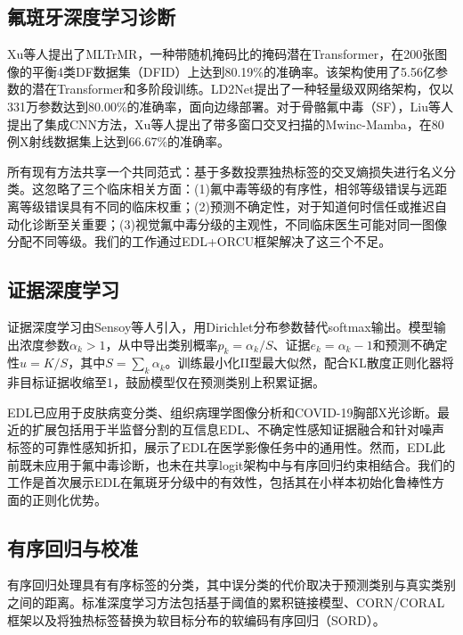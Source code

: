 \documentclass[12pt,a4paper]{ctexart}
\begin{document}
\subsection{氟斑牙深度学习诊断}

Xu等人提出了MLTrMR，一种带随机掩码比的掩码潜在Transformer，在200张图像的平衡4类DF数据集（DFID）上达到80.19\%的准确率\cite{xu2025mltrmr}。该架构使用了5.56亿参数的潜在Transformer和多阶段训练。LD2Net提出了一种轻量级双网络架构，仅以331万参数达到80.00\%的准确率\cite{li2026ld2net}，面向边缘部署。对于骨骼氟中毒（SF），Liu等人提出了集成CNN方法\cite{liu2021integrated}，Xu等人提出了带多窗口交叉扫描的Mwinc-Mamba\cite{xu2025mwinc}，在80例X射线数据集上达到66.67\%的准确率。

所有现有方法共享一个共同范式：基于多数投票独热标签的交叉熵损失进行名义分类。这忽略了三个临床相关方面：(1)氟中毒等级的有序性，相邻等级错误与远距离等级错误具有不同的临床权重；(2)预测不确定性，对于知道何时信任或推迟自动化诊断至关重要；(3)视觉氟中毒分级的主观性，不同临床医生可能对同一图像分配不同等级。我们的工作通过EDL+ORCU框架解决了这三个不足。

\subsection{证据深度学习}

证据深度学习由Sensoy等人引入\cite{sensoy2018edl}，用Dirichlet分布参数替代softmax输出。模型输出浓度参数$\alpha_k > 1$，从中导出类别概率$p_k = \alpha_k / S$、证据$e_k = \alpha_k - 1$和预测不确定性$u = K / S$，其中$S = \sum_k \alpha_k$。训练最小化II型最大似然，配合KL散度正则化器将非目标证据收缩至1，鼓励模型仅在预测类别上积累证据。

EDL已应用于皮肤病变分类、组织病理学图像分析和COVID-19胸部X光诊断\cite{ulmer2022prior}。最近的扩展包括用于半监督分割的互信息EDL\cite{he2024medl}、不确定性感知证据融合\cite{zheng2023uncertaintyfusion}和针对噪声标签的可靠性感知折扣\cite{li2024rednet}，展示了EDL在医学影像任务中的通用性。然而，EDL此前既未应用于氟中毒诊断，也未在共享logit架构中与有序回归约束相结合。我们的工作是首次展示EDL在氟斑牙分级中的有效性，包括其在小样本初始化鲁棒性方面的正则化优势。

\subsection{有序回归与校准}

有序回归处理具有有序标签的分类，其中误分类的代价取决于预测类别与真实类别之间的距离\cite{cao2020corn}。标准深度学习方法包括基于阈值的累积链接模型、CORN/CORAL框架\cite{cao2020corn}以及将独热标签替换为软目标分布的软编码有序回归（SORD）\cite{diaz2018sord}。
\end{document}
